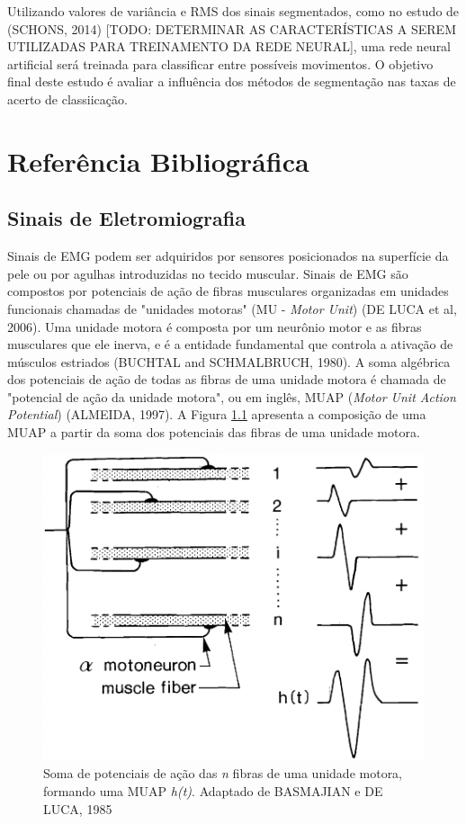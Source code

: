 \documentclass[
	12pt,				%
	openright,			%
	oneside,
	a4paper,			%
	english,			%
	francais,			%
	spanish,			%
	brazil				%
	]{abntex2}
\begin{document}
	Utilizando valores de variância e RMS dos sinais segmentados, como no estudo de (SCHONS, 2014) [TODO: DETERMINAR AS CARACTERÍSTICAS A SEREM UTILIZADAS PARA TREINAMENTO DA REDE NEURAL], uma rede neural artificial será treinada para classificar entre possíveis movimentos. O objetivo final deste estudo é avaliar a influência dos métodos de segmentação nas taxas de acerto de classiicação.
	
\chapter{Referência Bibliográfica}

\section{Sinais de Eletromiografia}

	Sinais de EMG podem ser adquiridos por sensores posicionados na superfície da pele ou por agulhas introduzidas no tecido muscular. Sinais de EMG são compostos por potenciais de ação de fibras musculares organizadas em unidades funcionais chamadas de "unidades motoras" (MU - \emph{Motor Unit}) (DE LUCA et al, 2006). Uma unidade motora é composta por um neurônio motor e as fibras musculares que ele inerva, e é a entidade fundamental que controla a ativação de músculos estriados (BUCHTAL and SCHMALBRUCH, 1980). A soma algébrica dos potenciais de ação de todas as fibras de uma unidade motora é chamada de "potencial de ação da unidade motora", ou em inglês, MUAP (\emph{Motor Unit Action Potential}) (ALMEIDA, 1997). A Figura \ref{fig:MUAP_comp} apresenta a composição de uma MUAP a partir da soma dos potenciais das fibras de uma unidade motora.

\begin{figure}
\centering
\includegraphics[width=0.6\linewidth]{./img/MUAP_oneMU.png}
\caption{Soma de potenciais de ação das \emph{n} fibras de uma unidade motora, formando uma MUAP \emph{h(t)}. Adaptado de BASMAJIAN e DE LUCA, 1985}
\label{fig:MUAP_comp}
\end{figure}
	
\end{document}

